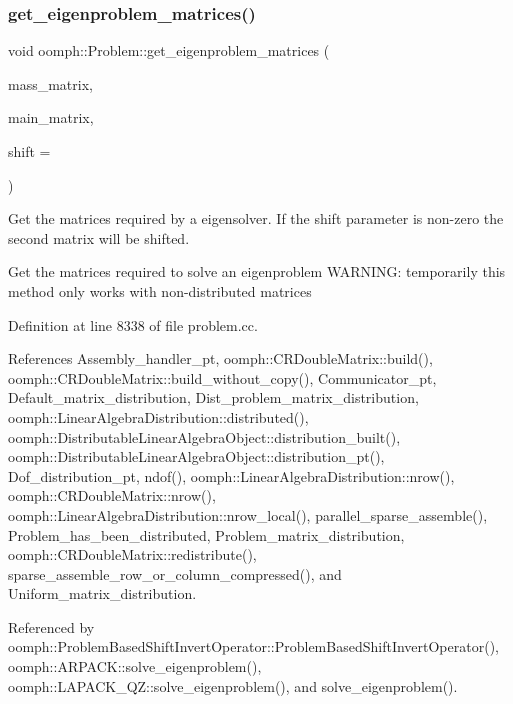 \subsubsection{\texorpdfstring{get\+\_\+eigenproblem\+\_\+matrices()}{get\_eigenproblem\_matrices()}}
{\footnotesize\ttfamily void oomph\+::\+Problem\+::get\+\_\+eigenproblem\+\_\+matrices (\begin{DoxyParamCaption}\item[{\hyperlink{classoomph_1_1CRDoubleMatrix}{C\+R\+Double\+Matrix} \&}]{mass\+\_\+matrix,  }\item[{\hyperlink{classoomph_1_1CRDoubleMatrix}{C\+R\+Double\+Matrix} \&}]{main\+\_\+matrix,  }\item[{const double \&}]{shift = {} }\end{DoxyParamCaption})\hspace{0.3cm}{\ttfamily [virtual]}}



Get the matrices required by a eigensolver. If the shift parameter is non-\/zero the second matrix will be shifted. 

Get the matrices required to solve an eigenproblem W\+A\+R\+N\+I\+NG\+: temporarily this method only works with non-\/distributed matrices 

Definition at line 8338 of file problem.\+cc.



References Assembly\+\_\+handler\+\_\+pt, oomph\+::\+C\+R\+Double\+Matrix\+::build(), oomph\+::\+C\+R\+Double\+Matrix\+::build\+\_\+without\+\_\+copy(), Communicator\+\_\+pt, Default\+\_\+matrix\+\_\+distribution, Dist\+\_\+problem\+\_\+matrix\+\_\+distribution, oomph\+::\+Linear\+Algebra\+Distribution\+::distributed(), oomph\+::\+Distributable\+Linear\+Algebra\+Object\+::distribution\+\_\+built(), oomph\+::\+Distributable\+Linear\+Algebra\+Object\+::distribution\+\_\+pt(), Dof\+\_\+distribution\+\_\+pt, ndof(), oomph\+::\+Linear\+Algebra\+Distribution\+::nrow(), oomph\+::\+C\+R\+Double\+Matrix\+::nrow(), oomph\+::\+Linear\+Algebra\+Distribution\+::nrow\+\_\+local(), parallel\+\_\+sparse\+\_\+assemble(), Problem\+\_\+has\+\_\+been\+\_\+distributed, Problem\+\_\+matrix\+\_\+distribution, oomph\+::\+C\+R\+Double\+Matrix\+::redistribute(), sparse\+\_\+assemble\+\_\+row\+\_\+or\+\_\+column\+\_\+compressed(), and Uniform\+\_\+matrix\+\_\+distribution.



Referenced by oomph\+::\+Problem\+Based\+Shift\+Invert\+Operator\+::\+Problem\+Based\+Shift\+Invert\+Operator(), oomph\+::\+A\+R\+P\+A\+C\+K\+::solve\+\_\+eigenproblem(), oomph\+::\+L\+A\+P\+A\+C\+K\+\_\+\+Q\+Z\+::solve\+\_\+eigenproblem(), and solve\+\_\+eigenproblem().

